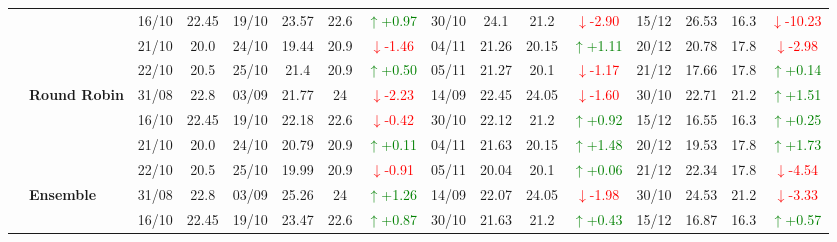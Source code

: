 {\begin{longtable}{llcc|cccc|cccc|cccc}
& 
& 16/10 & 22.45 & 19/10 & 23.57 & 22.6 & \textcolor{green}{\(\uparrow\)+0.97} & 30/10 & 24.1 & 21.2 & \textcolor{red}{\(\downarrow\)-2.90} & 15/12 & 26.53 & 16.3 & \textcolor{red}{\(\downarrow\)-10.23} \\

& 
& 21/10 & 20.0 & 24/10 & 19.44 & 20.9 & \textcolor{red}{\(\downarrow\)-1.46} & 04/11 & 21.26 & 20.15 & \textcolor{green}{\(\uparrow\)+1.11} & 20/12 & 20.78 & 17.8 & \textcolor{red}{\(\downarrow\)-2.98} \\

&
& 22/10 & 20.5 & 25/10 & 21.4 & 20.9 & \textcolor{green}{\(\uparrow\)+0.50} & 05/11 & 21.27 & 20.1 & \textcolor{red}{\(\downarrow\)-1.17} & 21/12 & 17.66 & 17.8 & \textcolor{green}{\(\uparrow\)+0.14} \\
\cmidrule(lr){2-16}


& \textbf{Round Robin}
& 31/08 & 22.8 & 03/09 & 21.77 & 24 & \textcolor{red}{\(\downarrow\)-2.23} & 14/09 & 22.45 & 24.05 & \textcolor{red}{\(\downarrow\)-1.60} & 30/10 & 22.71 & 21.2 & \textcolor{green}{\(\uparrow\)+1.51} \\

&
& 16/10 & 22.45 & 19/10 & 22.18 & 22.6 & \textcolor{red}{\(\downarrow\)-0.42} & 30/10 & 22.12 & 21.2 & \textcolor{green}{\(\uparrow\)+0.92} & 15/12 & 16.55 & 16.3 & \textcolor{green}{\(\uparrow\)+0.25} \\

&
& 21/10 & 20.0 & 24/10 & 20.79 & 20.9 & \textcolor{green}{\(\uparrow\)+0.11} & 04/11 & 21.63 & 20.15 & \textcolor{green}{\(\uparrow\)+1.48} & 20/12 & 19.53 & 17.8 & \textcolor{green}{\(\uparrow\)+1.73} \\

&
& 22/10 & 20.5 & 25/10 & 19.99 & 20.9 & \textcolor{red}{\(\downarrow\)-0.91} & 05/11 & 20.04 & 20.1 & \textcolor{green}{\(\uparrow\)+0.06} & 21/12 & 22.34 & 17.8 & \textcolor{red}{\(\downarrow\)-4.54} \\
\cmidrule(lr){2-16}


& \textbf{Ensemble}
& 31/08 & 22.8 & 03/09 & 25.26 & 24 & \textcolor{green}{\(\uparrow\)+1.26} & 14/09 & 22.07 & 24.05 & \textcolor{red}{\(\downarrow\)-1.98} & 30/10 & 24.53 & 21.2 & \textcolor{red}{\(\downarrow\)-3.33} \\

&
& 16/10 & 22.45 & 19/10 & 23.47 & 22.6 & \textcolor{green}{\(\uparrow\)+0.87} & 30/10 & 21.63 & 21.2 & \textcolor{green}{\(\uparrow\)+0.43} & 15/12 & 16.87 & 16.3 & \textcolor{green}{\(\uparrow\)+0.57} \\


\end{longtable}}
